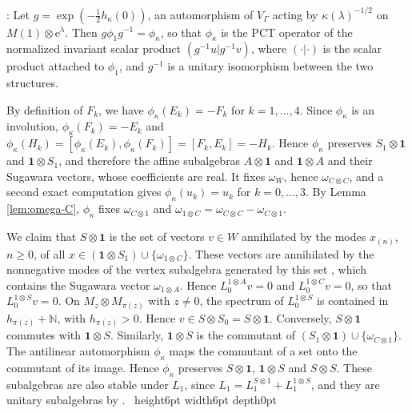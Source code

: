 \documentclass[leqno]{article}
\newcommand{\N}{\ensuremath{\mathbb{N}}}
\renewcommand{\geq}{\ensuremath{\geqslant}}
\newcommand{\qed}{\hfill \vrule height6pt  width6pt depth0pt}
\newcommand{\ot}{\otimes}
\newcommand{\e}{\mathrm{e}} %
\newenvironment{proof}[1][]{\noindent {\it Proof #1} : }{\hbox{~}\qed
\smallskip
}
\numberwithin{equation}{section}
\begin{document}
\begin{proof}
Let $g = \exp(-\frac12h_\kappa(0))$, an automorphism of $V_\Gamma$ acting by $\kappa(\lambda)^{-1/2}$ on $M(1) \ot \e^\lambda$. Then $g\phi_1g^{-1} = \phi_\kappa$, so that $\phi_\kappa$ is the PCT operator of the normalized invariant scalar product $(g^{-1}u|g^{-1}v)$, where $(\cdot|\cdot)$ is the scalar product attached to $\phi_1$, and $g^{-1}$ is a unitary isomorphism between the two structures.

By definition of $F_k$, we have $\phi_\kappa(E_k) = -F_k$ for $k = 1, \ldots, 4$. Since $\phi_\kappa$ is an involution, $\phi_\kappa(F_k) = -E_k$ and $\phi_\kappa(H_k) = [\phi_\kappa(E_k),\phi_\kappa(F_k)] = [F_k,E_k] = -H_k$. Hence $\phi_\kappa$ preserves $S_1 \ot \mathbf 1$ and $\mathbf 1 \ot S_1$, and therefore the affine subalgebras $A \ot \mathbf 1$ and $\mathbf 1 \ot A$ and their Sugawara vectors, whose coefficients are real. It fixes $\omega_W$, hence $\omega_{C \ot C}$, and a second exact computation gives $\phi_\kappa(u_k) = u_k$ for $k = 0, \ldots, 3$. By Lemma \ref{lem:omega-C}, $\phi_\kappa$ fixes $\omega_{C \ot 1}$ and $\omega_{1 \ot C} = \omega_{C \ot C}-\omega_{C \ot 1}$.

We claim that $S \ot \mathbf 1$ is the set of vectors $v \in W$ annihilated by the modes $x_{(n)}$, $n \geq 0$, of all $x \in (\mathbf 1 \ot S_1) \cup \{\omega_{1 \ot C}\}$. These vectors are annihilated by the nonnegative modes of the vertex subalgebra generated by this set \cite[Example 5.27 p.~44]{CKLW18}, which contains the Sugawara vector $\omega_{1 \ot A}$. Hence $L_0^{1 \ot A}v = 0$ and $L_0^{1 \ot C}v = 0$, so that $L_0^{1 \ot S}v = 0$. On $M_z \ot M_{\pi(z)}$ with $z \neq 0$, the spectrum of $L_0^{1 \ot S}$ is contained in $h_{\pi(z)}+\N$, with $h_{\pi(z)} > 0$. Hence $v \in S \ot S_0 = S \ot \mathbf 1$. Conversely, $S \ot \mathbf 1$ commutes with $\mathbf 1 \ot S$. Similarly, $\mathbf 1 \ot S$ is the commutant of $(S_1 \ot \mathbf 1) \cup \{\omega_{C \ot 1}\}$. The antilinear automorphism $\phi_\kappa$ maps the commutant of a set onto the commutant of its image. Hence $\phi_\kappa$ preserves $S \ot \mathbf 1$, $\mathbf 1 \ot S$ and $S \ot S$. These subalgebras are also stable under $L_1$, since $L_1 = L_1^{S \ot 1}+L_1^{1 \ot S}$, and they are unitary subalgebras by \cite[Proposition 5.23 p.~43]{CKLW18}.
\end{proof}
\end{document}
